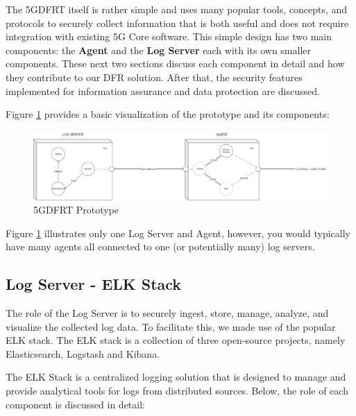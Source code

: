 \documentclass[final,1p,times,authoryear]{elsarticle}
\begin{document}
\vspace{1em}

The 5GDFRT itself is rather simple and uses many popular tools, concepts, and protocols to securely collect information that is both useful and does not require integration with existing 5G Core software. This simple design has two main components: the \textbf{Agent} and the \textbf{Log Server} each with its own smaller components. These next two sections discuss each component in detail and how they contribute to our DFR solution. After that, the security features implemented for information assurance and data protection are discussed.

\vspace{1em}

Figure \ref{fig:basic_prototype} provides a basic visualization of the prototype and its components:

\begin{figure}[H]
     \centering
     \includegraphics[width=1.15\textwidth, height=1.15\textheight, keepaspectratio]{diagrams/Basic_Prototype.png}
     \caption{5GDFRT Prototype}
     \label{fig:basic_prototype}
\end{figure}

Figure \ref{fig:basic_prototype} illustrates only one Log Server and Agent, however, you would typically have many agents all connected to one (or potentially many) log servers.

\subsection{Log Server - ELK Stack}
\label{sub3sub2}
The role of the Log Server is to securely ingest, store, manage, analyze, and visualize the collected log data. To facilitate this, we made use of the popular ELK stack. The ELK stack is a collection of three open-source projects, namely Elasticsearch, Logstash and Kibana.

\vspace{1em}

The ELK Stack is a centralized logging solution that is designed to manage and provide analytical tools for logs from distributed sources. Below, the role of each component is discussed in detail:
\end{document}
